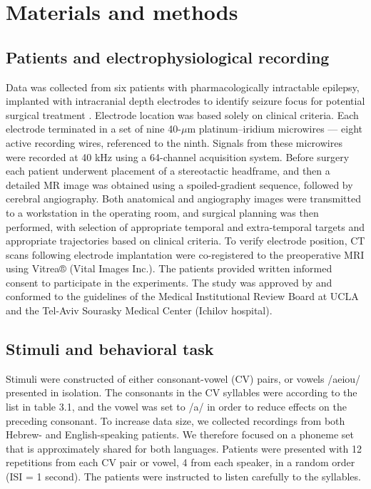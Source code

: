 \section{Materials and methods}
\subsection{Patients and electrophysiological recording}
Data was collected from six patients with pharmacologically intractable epilepsy, implanted with intracranial depth electrodes to identify seizure focus for potential surgical treatment \citep{mukamel2012human}. Electrode location was based solely on clinical criteria. Each electrode terminated in a set of nine 40-$\mu$m platinum–iridium microwires \citep{fried1999cerebral} — eight active recording wires, referenced to the ninth. Signals from these microwires were recorded at 40 kHz using a 64-channel acquisition system. Before surgery each patient underwent placement of a stereotactic headframe, and then a detailed MR image was obtained using a spoiled-gradient sequence, followed by cerebral angiography. Both anatomical and angiography images were transmitted to a workstation in the operating room, and surgical planning was then performed, with selection of appropriate temporal and extra-temporal targets and appropriate trajectories based on clinical criteria. To verify electrode position, CT scans following electrode implantation were co-registered to the preoperative MRI using Vitrea® (Vital Images Inc.). The patients provided written informed consent to participate in the experiments. The study was approved by and conformed to the guidelines of the Medical Institutional Review Board at UCLA and the Tel-Aviv Sourasky Medical Center (Ichilov hospital).

\subsection{Stimuli and behavioral task}
Stimuli were constructed of either consonant-vowel (CV) pairs, or vowels /aeiou/ presented in isolation. The consonants in the CV syllables were according to the list in table 3.1, and the vowel was set to /a/ in order to reduce effects on the preceding consonant. To increase data size, we collected recordings from both Hebrew- and English-speaking patients. We therefore focused on a phoneme set that is approximately shared for both languages. Patients  were presented with 12 repetitions from each CV pair or vowel, 4 from each speaker, in a random order (ISI = 1 second). The patients were instructed to listen carefully to the syllables.



